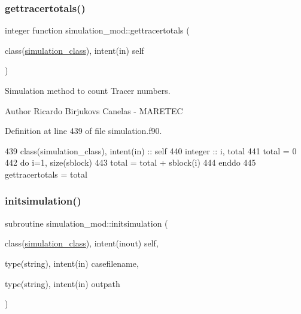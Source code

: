 \subsubsection{\texorpdfstring{gettracertotals()}{gettracertotals()}}
{\footnotesize\ttfamily integer function simulation\+\_\+mod\+::gettracertotals (\begin{DoxyParamCaption}\item[{class(\mbox{\hyperlink{structsimulation__mod_1_1simulation__class}{simulation\+\_\+class}}), intent(in)}]{self }\end{DoxyParamCaption})\hspace{0.3cm}{\ttfamily [private]}}



Simulation method to count Tracer numbers. 

\begin{DoxyAuthor}{Author}
Ricardo Birjukovs Canelas -\/ M\+A\+R\+E\+T\+EC 
\end{DoxyAuthor}


Definition at line 439 of file simulation.\+f90.


\begin{DoxyCode}
439     \textcolor{keywordtype}{class}(simulation\_class), \textcolor{keywordtype}{intent(in)} :: self
440     \textcolor{keywordtype}{integer} :: i, total
441     total = 0
442     \textcolor{keywordflow}{do} i=1, \textcolor{keyword}{size}(sblock)
443         total = total + sblock(i)%
444 \textcolor{keywordflow}{    enddo}
445     gettracertotals = total
\end{DoxyCode}
\mbox{\label{namespacesimulation__mod_aedbba2bb458cbcd7eb93938a5f7b5940}} 
\subsubsection{\texorpdfstring{initsimulation()}{initsimulation()}}
{\footnotesize\ttfamily subroutine simulation\+\_\+mod\+::initsimulation (\begin{DoxyParamCaption}\item[{class(\mbox{\hyperlink{structsimulation__mod_1_1simulation__class}{simulation\+\_\+class}}), intent(inout)}]{self,  }\item[{type(string), intent(in)}]{casefilename,  }\item[{type(string), intent(in)}]{outpath }\end{DoxyParamCaption})\hspace{0.3cm}{\ttfamily [private]}}



